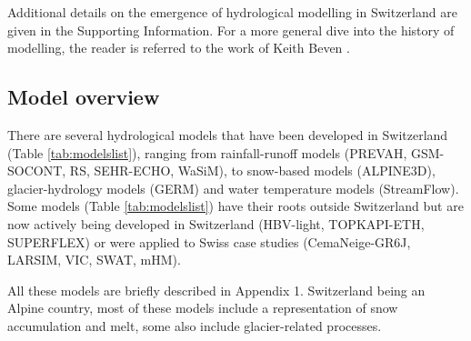 \documentclass[10pt,a4paper]{article}
\begin{document}
Additional details on the emergence of hydrological modelling in Switzerland are given in the Supporting Information. For a more general dive into the history of modelling, the reader is referred to the work of Keith Beven \citep{Beven_2020,Beven_2020a}.


\subsection{Model overview}
\label{sec:models:overview}

There are several hydrological models that have been developed in Switzerland (Table \ref{tab:modelslist}), ranging from rainfall-runoff models (PREVAH, GSM-SOCONT, RS, SEHR-ECHO, WaSiM), to snow-based models (ALPINE3D), glacier-hydrology models (GERM) and water temperature models (StreamFlow). Some models (Table \ref{tab:modelslist}) have their roots outside Switzerland but are now actively being developed in Switzerland (HBV-light, TOPKAPI-ETH, SUPERFLEX) or were applied to Swiss case studies (CemaNeige-GR6J, LARSIM, VIC, SWAT, mHM). 

All these models are briefly described in Appendix 1. Switzerland being an Alpine country, most of these models include a representation of snow accumulation and melt, some also include glacier-related processes.
\end{document}

